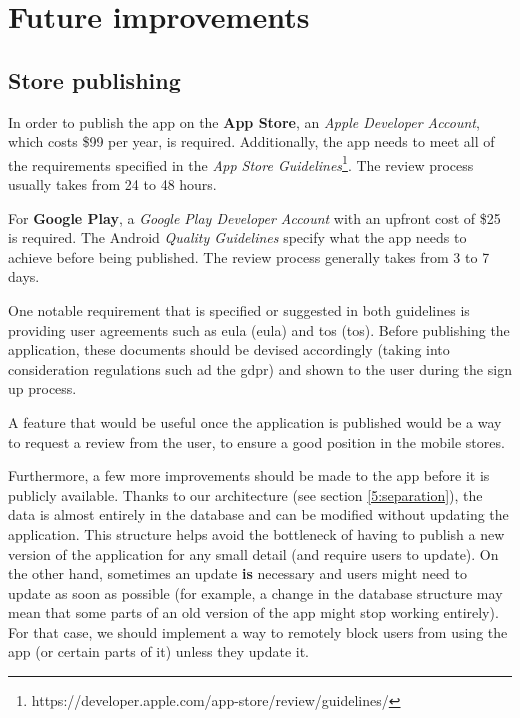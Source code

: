 \section{Future improvements} \label{6:future}
    \subsection{Store publishing} \label{6:future_publish}
    In order to publish the app on the \textbf{App Store}, an \textit{Apple Developer Account}, which costs \$99 per year, is required. Additionally, the app needs to meet all of the requirements specified in the \textit{App Store Guidelines}\footnote{https://developer.apple.com/app-store/review/guidelines/}. The review process usually takes from 24 to 48 hours.
    
    For \textbf{Google Play}, a \textit{Google Play Developer Account} with an upfront cost of \$25 is required. The Android \textit{Quality Guidelines} specify what the app needs to achieve before being published. The review process generally takes from 3 to 7 days.
    
    One notable requirement that is specified or suggested in both guidelines is providing user agreements such as \acrshort{eula} (\acrlong{eula}) and \acrshort{tos} (\acrlong{tos}). Before publishing the application, these documents should be devised accordingly (taking into consideration regulations such ad the \acrshort{gdpr}) and shown to the user during the sign up process.
    
    A feature that would be useful once the application is published would be a way to request a review from the user, to ensure a good position in the mobile stores.
    
    Furthermore, a few more improvements should be made to the app before it is publicly available. Thanks to our architecture (see section \ref{5:separation}), the data is almost entirely in the database and can be modified without updating the application. This structure helps avoid the bottleneck of having to publish a new version of the application for any small detail (and require users to update). On the other hand, sometimes an update \textbf{is} necessary and users might need to update as soon as possible (for example, a change in the database structure may mean that some parts of an old version of the app might stop working entirely). For that case, we should implement a way to remotely block users from using the app (or certain parts of it) unless they update it.
    
